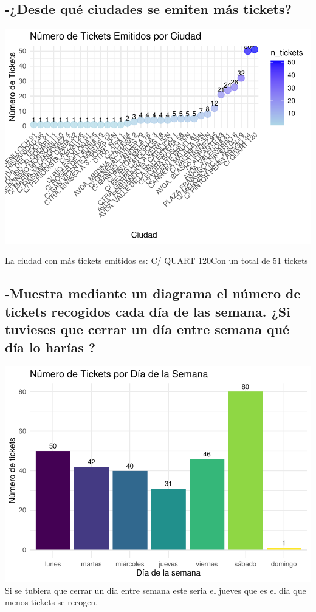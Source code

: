 \documentclass[,article,submit,moreauthors,pdftex]{Definitions/mdpi}
\begin{document}
\hypertarget{desde-quuxe9-ciudades-se-emiten-muxe1s-tickets}{%
\subsection{-¿Desde qué ciudades se emiten más
tickets?}\label{desde-quuxe9-ciudades-se-emiten-muxe1s-tickets}}

\includegraphics[width=0.9\linewidth]{ProyectoTD2025_files/figure-latex/unnamed-chunk-22-1}

La ciudad con más tickets emitidos es: C/ QUART 120Con un total de 51
tickets

\hypertarget{muestra-mediante-un-diagrama-el-nuxfamero-de-tickets-recogidos-cada-duxeda-de-las-semana.-si-tuvieses-que-cerrar-un-duxeda-entre-semana-quuxe9-duxeda-lo-haruxedas}{%
\subsection{-Muestra mediante un diagrama el número de tickets recogidos
cada día de las semana. ¿Si tuvieses que cerrar un día entre semana qué
día lo harías
?}\label{muestra-mediante-un-diagrama-el-nuxfamero-de-tickets-recogidos-cada-duxeda-de-las-semana.-si-tuvieses-que-cerrar-un-duxeda-entre-semana-quuxe9-duxeda-lo-haruxedas}}

\includegraphics[width=0.9\linewidth]{ProyectoTD2025_files/figure-latex/unnamed-chunk-23-1}
Si se tubiera que cerrar un dia entre semana este seria el jueves que es
el dia que menos tickets se recogen.
\end{document}
